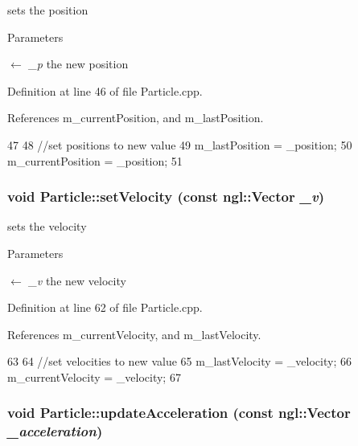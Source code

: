 sets the position 


\begin{DoxyParams}{Parameters}
\item[\mbox{$\leftarrow$} {\em \_\-p}]the new position \end{DoxyParams}


Definition at line 46 of file Particle.cpp.



References m\_\-currentPosition, and m\_\-lastPosition.




\begin{DoxyCode}
47 {
48     //set positions to new value
49     m_lastPosition = _position;
50     m_currentPosition = _position;
51 }
\end{DoxyCode}


\hypertarget{class_particle_ad823b77c5f15777b71f2756698c6ec23}{
\subsubsection[{setVelocity}]{\setlength{\rightskip}{0pt plus 5cm}void Particle::setVelocity (const ngl::Vector {\em \_\-v})}}
\label{class_particle_ad823b77c5f15777b71f2756698c6ec23}


sets the velocity 


\begin{DoxyParams}{Parameters}
\item[\mbox{$\leftarrow$} {\em \_\-v}]the new velocity \end{DoxyParams}


Definition at line 62 of file Particle.cpp.



References m\_\-currentVelocity, and m\_\-lastVelocity.




\begin{DoxyCode}
63 {
64     //set velocities to new value
65     m_lastVelocity = _velocity;
66     m_currentVelocity = _velocity;
67 }
\end{DoxyCode}


\hypertarget{class_particle_a3dc6c80a3666583b038e90d8baac21e0}{
\subsubsection[{updateAcceleration}]{\setlength{\rightskip}{0pt plus 5cm}void Particle::updateAcceleration (const ngl::Vector {\em \_\-acceleration})}}
\label{class_particle_a3dc6c80a3666583b038e90d8baac21e0}


